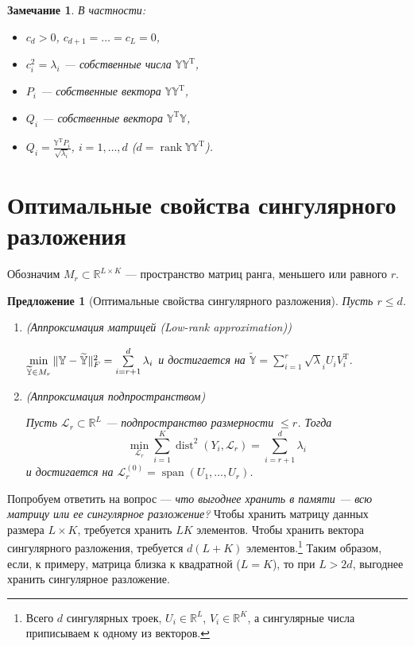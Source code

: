 \documentclass[specialist, 12pt,
subf, %
href, colorlinks=true,
substylefile = spbu.rtx,
]{disser}
\newtheorem{proposition}{Предложение}
\newtheorem{remark}{Замечание}
\DeclareMathOperator{\spn}{span}
\DeclareMathOperator{\rnk}{rank}
\DeclareMathOperator{\dist}{dist}
\begin{document}
\begin{remark}
	В частности:
	\begin{itemize}
	\item $c_d > 0$, $c_{d+1} = \ldots = c_L = 0$,
	\item $c_i^2 = \lambda_i$ --- собственные числа $\mathbb{Y}\mathbb{Y}^{\mathrm{T}}$,
	\item $P_i$ --- собственные вектора $\mathbb{Y}\mathbb{Y}^{\mathrm{T}}$,
	\item $Q_i$ --- собственные вектора $\mathbb{Y}^{\mathrm{T}}\mathbb{Y}$,
	\item $Q_i = \frac{\mathbb{Y}^{\mathrm{T}} P_i}{\sqrt{\lambda_i}}$, $i = 1,\ldots,d$ ($d = \rnk\mathbb{Y}\mathbb{Y}^\mathrm{T}$).
	\end{itemize}
\end{remark}

\section{Оптимальные свойства сингулярного разложения}
Обозначим $M_r \subset \mathbb{R}^{L\times K}$ --- пространство матриц ранга, меньшего или равного $r$.
\begin{proposition}[Оптимальные свойства сингулярного разложения]
	Пусть $r\le d$.
	\begin{enumerate}
		\item (Аппроксимация матрицей (Low-rank approximation))
		
		$\min \limits_{\widetilde{\mathbb{Y}}\in M_r} \Arrowvert \mathbb{Y} - \widetilde{\mathbb{Y}}\Arrowvert^2_F =\sum\limits_{i =r+1}^d \lambda_i $ и достигается на $\widetilde{\mathbb{Y}}=\sum\limits_{i =1}^r \sqrt \lambda_i U_i V_i^\mathrm{T}.$
		\item (Аппроксимация подпространством)
		
		Пусть $\mathcal{L}_r \subset \mathbb{R}^L$ --- подпространство размерности $\le r$. Тогда
		\begin{equation*}
		\min\limits_{\mathcal{L}_r} \sum \limits_{i =1}^K \dist^2(Y_i,\mathcal{L}_r)=\sum \limits_{i =r+1}^d \lambda_i
		\end{equation*}
		и достигается на $\mathcal{L}_r^{(0)}=\spn (U_1,\ldots,U_r)$.
	\end{enumerate}
\end{proposition}

Попробуем ответить на вопрос --- \textit{что выгоднее хранить в памяти --- всю матрицу или ее сингулярное разложение?} Чтобы хранить матрицу данных размера $L\times K$, требуется хранить $LK$ элементов. Чтобы хранить вектора сингулярного разложения, требуется $d(L+K)$ элементов.\footnote{Всего $d$ сингулярных троек, $U_i \in \mathbb{R}^L$, $V_i\in \mathbb{R}^K$, а сингулярные числа приписываем к одному из векторов.} Таким образом, если, к примеру, матрица близка к квадратной ($L=K$), то при $L>2d$, выгоднее хранить сингулярное разложение.
\end{document}
